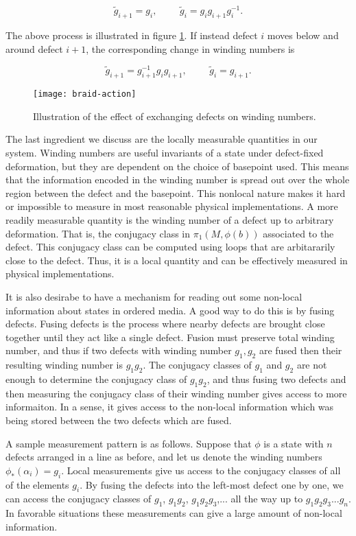 $$\tilde{g}_{i+1}=g_i,\,\,\,\,\,\,\,\,\,\,\,\,\,\, \tilde{g}_i=g_{i}g_{i+1}g_{i}^{-1}.$$ 

The above process is illustrated in figure \ref{fig:braid-action}. If instead defect $i$ moves below and around defect $i+1$, the corresponding change in winding numbers is 

$$\tilde{g}_{i+1}=g_{i+1}^{-1}g_ig_{i+1},\,\,\,\,\,\,\,\,\,\,\,\,\,\, \tilde{g}_{i}=g_{i+1}.$$ 

\begin{figure}
\begin{center}
\texttt{[image: braid-action]}
\caption{Illustration of the effect of exchanging defects on winding numbers.}
\label{fig:braid-action}
\end{center}
\end{figure}

The last ingredient we discuss are the locally measurable quantities in our system. Winding numbers are useful invariants of a state under defect-fixed deformation, but they are dependent on the choice of basepoint used. This means that the information encoded in the winding number is spread out over the whole region between the defect and the basepoint. This nonlocal nature makes it hard or impossible to measure in most reasonable physical implementations. A more readily measurable quantity is the winding number of a defect up to arbitrary deformation. That is, the conjugacy class in $\pi_1(M,\phi(b))$ associated to the defect. This conjugacy class can be computed using loops that are arbitararily close to the defect. Thus, it is a local quantity and can be effectively measured in physical implementations.

It is also desirabe to have a mechanism for reading out some non-local information about states in ordered media. A good way to do this is by fusing defects. Fusing defects is the process where nearby defects are brought close together until they act like a single defect. Fusion must preserve total winding number, and thus if two defects with winding number $g_1,g_2$ are fused then their resulting winding number is $g_1g_2$. The conjugacy classes of $g_1$ and $g_2$ are not enough to determine the conjugacy class of $g_1g_2$, and thus fusing two defects and then measuring the conjugacy class of their winding number gives access to more informaiton. In a sense, it gives access to the non-local information which was being stored between the two defects which are fused.

A sample measurement pattern is as follows.  Suppose that $\phi$ is a state with $n$ defects arranged in a line as before, and let us denote the winding numbers $\phi_*(\alpha_i)=g_i$. Local measurements give us access to the conjugacy classes of all of the elements $g_i$. By fusing the defects into the left-most defect one by one, we can access the conjugacy classes of $g_1$, $g_1g_2$,  $g_1g_2g_3$,... all the way up to $g_1g_2g_3...g_n$. In favorable situations these measurements can give a large amount of non-local information.


